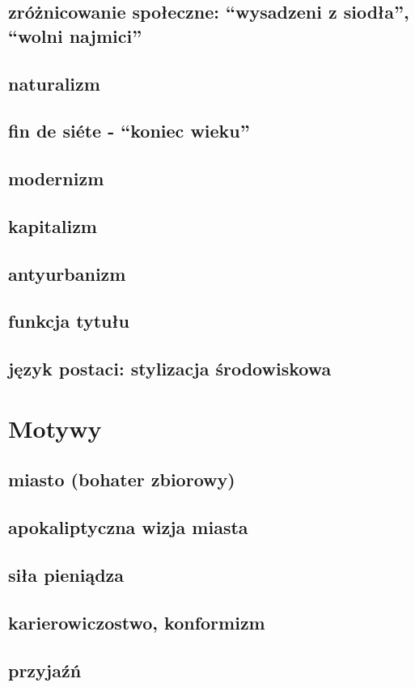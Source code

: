 \documentclass{article}
\begin{document}
\subsection{zróżnicowanie społeczne: ``wysadzeni z siodła'', ``wolni najmici''}
\subsection{naturalizm}
\subsection{fin de si\'ete - ``koniec wieku''}
\subsection{modernizm}
\subsection{kapitalizm}
\subsection{antyurbanizm}
\subsection{funkcja tytułu}
\subsection{język postaci: stylizacja środowiskowa}
\section{Motywy}
\subsection{miasto (bohater zbiorowy)}
\subsection{apokaliptyczna wizja miasta}
\subsection{siła pieniądza}
\subsection{karierowiczostwo, konformizm}
\subsection{przyjaźń}
\end{document}

